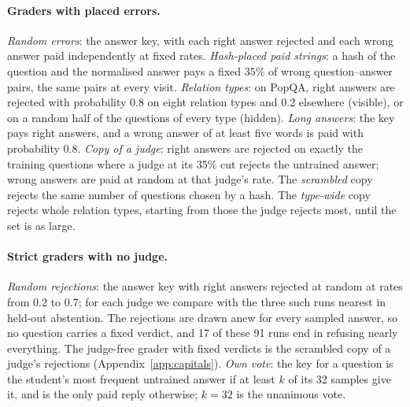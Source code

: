 \paragraph{Graders with placed errors.} \emph{Random errors}: the answer key, with each right answer rejected and each wrong answer paid independently at fixed rates. \emph{Hash-placed paid strings}: a hash of the question and the normalised answer pays a fixed 35\% of wrong question--answer pairs, the same pairs at every visit. \emph{Relation types}: on PopQA, right answers are rejected with probability 0.8 on eight relation types and 0.2 elsewhere (visible), or on a random half of the questions of every type (hidden). \emph{Long answers}: the key pays right answers, and a wrong answer of at least five words is paid with probability 0.8. \emph{Copy of a judge}: right answers are rejected on exactly the training questions where a judge at its 35\% cut rejects the untrained answer; wrong answers are paid at random at that judge's rate. The \emph{scrambled} copy rejects the same number of questions chosen by a hash. The \emph{type-wide} copy rejects whole relation types, starting from those the judge rejects most, until the set is as large.

\paragraph{Strict graders with no judge.} \emph{Random rejections}: the answer key with right answers rejected at random at rates from 0.2 to 0.7; for each judge we compare with the three such runs nearest in held-out abstention. The rejections are drawn anew for every sampled answer, so no question carries a fixed verdict, and 17 of these 91 runs end in refusing nearly everything. The judge-free grader with fixed verdicts is the scrambled copy of a judge's rejections (Appendix~\ref{app:capitals}). \emph{Own vote}: the key for a question is the student's most frequent untrained answer if at least $k$ of its 32 samples give it, and \idk{} is the only paid reply otherwise; $k=32$ is the unanimous vote.

